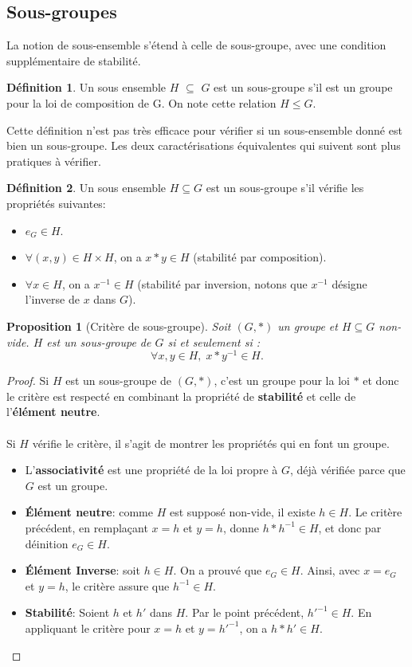 \documentclass[oneside,12pt,french,table]{book}
\newtheorem{prop}{Proposition}[section]
\theoremstyle{definition}
\theoremstyle{definition}
\theoremstyle{definition}
\newtheorem{definition}{Définition}[chapter]
\begin{document}
\subsection{Sous-groupes}
\noindent La notion de sous-ensemble s'étend à celle de sous-groupe, avec une condition supplémentaire de stabilité.
\begin{definition}
Un sous ensemble $H$ $\subseteq$ $G$ est un sous-groupe s'il est un groupe pour la loi de composition de G. On note cette relation $H \leq G$.
\end{definition}
\noindent
Cette définition n'est pas très efficace pour vérifier si un sous-ensemble donné est bien un sous-groupe. Les deux caractérisations équivalentes qui suivent sont plus pratiques à vérifier. 
\begin{definition}
Un sous ensemble $H \subseteq G$ est un sous-groupe s'il vérifie les propriétés suivantes:
\begin{itemize}
     \item $e_G \in H$.
     \item $\forall (x,y) \in H \times H$, on a $x*y \in H$ (stabilité par composition).
     \item $\forall x \in H$, on a $x^{-1} \in H$ (stabilité par inversion, notons que $x^{-1}$ désigne l'inverse de $x$ dans $G$).
\end{itemize}
\end{definition}
\begin{prop}[Critère de sous-groupe]
Soit $(G, *)$ un groupe et $H \subseteq G$ non-vide. $H$ est un sous-groupe de $G$ si et seulement si : 
$$\forall x,y \in H, \; x * y^{-1} \in H.$$
\end{prop}
\begin{proof}
Si $H$ est un sous-groupe de $(G, *)$, c'est un groupe pour la loi $*$ et donc le critère est respecté en combinant la propriété de \textbf{stabilité} et celle de l'\textbf{élément neutre}. \\
\\
Si $H$ vérifie le critère, il s'agit de montrer les propriétés qui en font un groupe.
\begin{itemize}
    \item L'\textbf{associativité} est une propriété de la loi propre à $G$, déjà vérifiée parce que $G$ est un groupe.
    \item \textbf{Élément neutre}: comme $H$ est supposé non-vide, il existe $h \in H$. Le critère précédent, en remplaçant $x=h$ et $y=h$, donne $h * h^{-1} \in H$, et donc par déinition $e_G \in H$.
    \item \textbf{Élément Inverse}: soit $h \in H$. On a prouvé que $e_G \in H$. Ainsi, avec $x = e_G$ et $y = h$, le critère assure que $h^{-1} \in H$.
    \item \textbf{Stabilité}: Soient $h$ et $h'$ dans $H$. Par le point précédent, $h'^{-1} \in H$. En appliquant le critère pour $x=h$ et $y = h'^{-1}$, on a $h * h' \in H$.
\end{itemize}
\end{proof}
\end{document}
